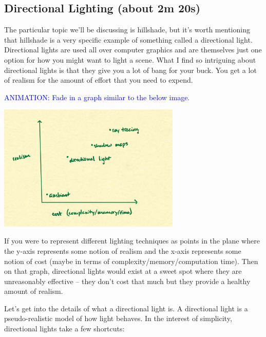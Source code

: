 \documentclass{article}
\newcommand\animation[1]{\textcolor{blue}{ANIMATION: #1}}
\begin{document}
\subsection{Directional Lighting (about 2m 20s)}

The particular topic we'll be discussing is hillshade, but it's worth mentioning that hillshade is a very specific example of something called a directional light.
Directional lights are used all over computer graphics and are themselves just one option for how you might want to light a scene.
What I find so intriguing about directional lights is that they give you a lot of bang for your buck.
You get a lot of realism for the amount of effort that you need to expend.

\animation{Fade in a graph similar to the below image.}

\begin{center}
	\includegraphics[width=0.65\textwidth,frame]{assets/realism.jpg}
\end{center}

If you were to represent different lighting techniques as points in the plane where the y-axis represents some notion of realism and the x-axis represents some notion of cost (maybe in terms of complexity/memory/computation time).
Then on that graph, directional lights would exist at a sweet spot where they are unreasonably effective -- they don't cost that much but they provide a healthy amount of realism.

Let's get into the details of what a directional light is.
A directional light is a pseudo-realistic model of how light behaves.
In the interest of simplicity, directional lights take a few shortcuts:
\end{document}
